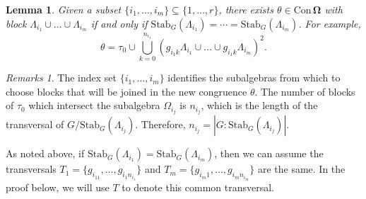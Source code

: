 \documentclass[cm,dissertation,actual,final]{uhthesis}
\theoremstyle{plain}
\newtheorem{lemma}[theorem]{Lemma}
\theoremstyle{definition}
\theoremstyle{remark}
\newtheorem*{remarks}{Remarks}
\numberwithin{theorem}{section}
\numberwithin{claim}{chapter}
\numberwithin{equation}{section}
\numberwithin{conjecture}{chapter}
\newcommand{\<}{\ensuremath{\langle}}
\renewcommand{\>}{\ensuremath{\rangle}}
\newcommand{\Stab}{\ensuremath{\mathrm{Stab}}}
\newcommand{\Con}{\ensuremath{\mathrm{Con\,}}}
\newcommand{\0}{\ensuremath{\mathbf{0}}}
\newcommand{\1}{\ensuremath{\mathbf{1}}}
\newcommand{\2}{\ensuremath{\mathbf{2}}}
\newcommand{\3}{\ensuremath{\mathbf{3}}}
\newcommand{\4}{\ensuremath{\mathbf{4}}}
\newcommand{\5}{\ensuremath{\mathbf{5}}}
\newcommand{\bOmega}{\ensuremath{\alg \Omega}}
\newcommand{\ConO}{\ensuremath{\Con \bOmega}}
\newcommand{\alg}[1]{\mathbf{#1}}
\begin{document}
\begin{lemma}
\label{lemma-intransGsets}
Given a subset $\{i_1, \dots, i_m\} \subseteq \{1,\dots, r\}$, 
there exists $\theta \in \ConO$ with block $\Lambda_{i_1} \cup \dots \cup \Lambda_{i_m}$ if and only if
$\Stab_G(\Lambda_{i_1}) = \cdots = \Stab_G(\Lambda_{i_m})$.  For example,
\begin{equation}
  \label{eq:th}
\theta = \tau_0 \cup \bigcup_{k=0}^{n_{i_1}} 
\left(g_{{i_1}k}\Lambda_{i_1} \cup \dots \cup g_{{i_1}k} \Lambda_{i_m}\right)^2. 
\end{equation}
\end{lemma}
\begin{remarks}
  The index set $\{i_1, \dots, i_m\}$ identifies the subalgebras from which to
  choose blocks that will be joined in the new congruence $\theta$.  
  The number of blocks of $\tau_0$ which
  intersect the subalgebra $\Omega_{i_j}$ is $n_{i_j}$, which is the length of the
  transversal of $G/\Stab_G(\Lambda_{i_j})$. Therefore, $n_{i_j} = |G:\Stab_G(\Lambda_{i_j})|$.  

  As noted above, if
  $\Stab_G(\Lambda_{i_1}) = \Stab_G(\Lambda_{i_m})$, then we can assume the transversals
  $T_1 = \{g_{i_11}, \dots, g_{i_1n_{i_1}}\}$ and  
  $T_m = \{g_{i_m1}, \dots,g_{i_mn_{i_m}}\}$ are the same. 
In the proof below, we will use $T$ to denote this common transversal.
\end{remarks}
\end{document}
